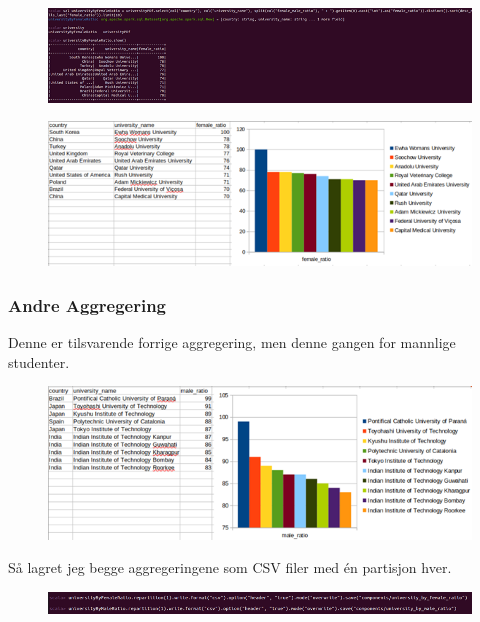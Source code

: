 \FigureCounter
\begin{figure}[H]
    \includegraphics[width=\textwidth]{images/milepael5/uniFemaleRatio.png}
\end{figure}
\FigureCounter
\begin{figure}[H]
    \includegraphics[width=\textwidth]{images/milepael5/resUniFemRatio.png}
\end{figure}

\subsubsection{Andre Aggregering}
Denne er tilsvarende forrige aggregering, men denne gangen for mannlige studenter.

\FigureCounter
\begin{figure}[H]
    \includegraphics[width=\textwidth]{images/milepael5/resUniMaleRatio.png}
\end{figure}

Så lagret jeg begge aggregeringene som CSV filer med én partisjon hver.

\FigureCounter
\begin{figure}[H]
    \includegraphics[width=\textwidth]{images/milepael5/writeToFile.png}
\end{figure}

